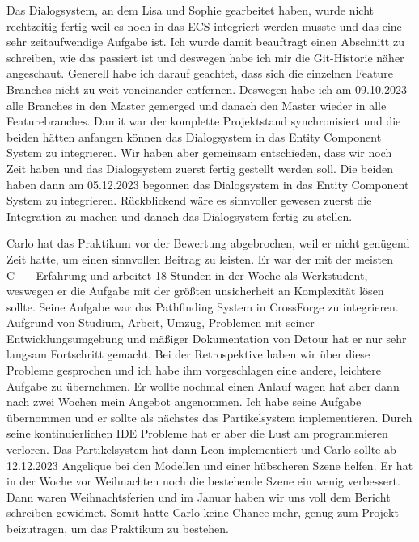 Das Dialogsystem, an dem Lisa und Sophie gearbeitet haben, wurde nicht rechtzeitig fertig weil es noch in das ECS integriert werden musste und das eine sehr zeitaufwendige Aufgabe ist. Ich wurde damit beauftragt einen Abschnitt zu schreiben, wie das passiert ist und deswegen habe ich mir die Git-Historie näher angeschaut. Generell habe ich darauf geachtet, dass sich die einzelnen Feature Branches nicht zu weit voneinander entfernen. Deswegen habe ich am 09.10.2023 alle Branches in den Master gemerged und danach den Master wieder in alle Featurebranches. Damit war der komplette Projektstand synchronisiert und die beiden hätten anfangen können das Dialogsystem in das Entity Component System zu integrieren. Wir haben aber gemeinsam entschieden, dass wir noch Zeit haben und das Dialogsystem zuerst fertig gestellt werden soll. Die beiden haben dann am 05.12.2023 begonnen das Dialogsystem in das Entity Component System zu integrieren. Rückblickend wäre es sinnvoller gewesen zuerst die Integration zu machen und danach das Dialogsystem fertig zu stellen.

Carlo hat das Praktikum vor der Bewertung abgebrochen, weil er nicht genügend Zeit hatte, um einen sinnvollen Beitrag zu leisten. Er war der mit der meisten C++ Erfahrung und arbeitet 18 Stunden in der Woche als Werkstudent, weswegen er die Aufgabe mit der größten unsicherheit an Komplexität lösen sollte. Seine Aufgabe war das Pathfinding System in CrossForge zu integrieren. Aufgrund von Studium, Arbeit, Umzug, Problemen mit seiner Entwicklungsumgebung und mäßiger Dokumentation von Detour hat er nur sehr langsam Fortschritt gemacht.  Bei der Retrospektive haben wir über diese Probleme gesprochen und ich habe ihm vorgeschlagen eine andere, leichtere Aufgabe zu übernehmen. Er wollte nochmal einen Anlauf wagen hat aber dann nach zwei Wochen mein Angebot angenommen. Ich habe seine Aufgabe übernommen und er sollte als nächstes das Partikelsystem implementieren. Durch seine kontinuierlichen IDE Probleme hat er aber die Lust am programmieren verloren. Das Partikelsystem hat dann Leon implementiert und Carlo sollte ab 12.12.2023 Angelique bei den Modellen und einer hübscheren Szene helfen. Er hat in der Woche vor Weihnachten noch die bestehende Szene ein wenig verbessert. Dann waren Weihnachtsferien und im Januar haben wir uns voll dem Bericht schreiben gewidmet. Somit hatte Carlo keine Chance mehr, genug zum Projekt beizutragen, um das Praktikum zu bestehen.
